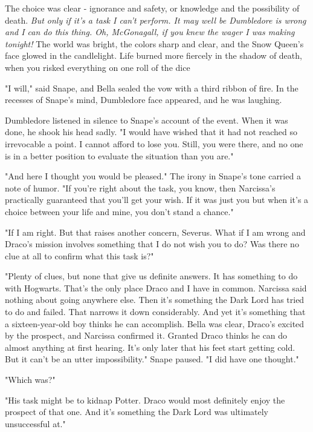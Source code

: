 The choice was clear - ignorance and safety, or knowledge and the possibility of death. \emph{But only if it's a task I can't perform. It may well be Dumbledore is wrong and I can do this thing. Oh, McGonagall, if you knew the wager I was making tonight!} The world was bright, the colors sharp and clear, and the Snow Queen's face glowed in the candlelight. Life burned more fiercely in the shadow of death, when you risked everything on one roll of the dice{\el}

"I will," said Snape, and Bella sealed the vow with a third ribbon of fire. In the recesses of Snape's mind, Dumbledore face appeared, and he was laughing.

\sbreak

Dumbledore listened in silence to Snape's account of the event. When it was done, he shook his head sadly. "I would have wished that it had not reached so irrevocable a point. I cannot afford to lose you. Still, you were there, and no one is in a better position to evaluate the situation than you are."

"And here I thought you would be pleased." The irony in Snape's tone carried a note of humor. "If you're right about the task, you know, then Narcissa's practically guaranteed that you'll get your wish. If it was just you{\el} but when it's a choice between your life and mine, you don't stand a chance."

"If I am right. But that raises another concern, Severus. What if I am wrong and Draco's mission involves something that I do not wish you to do? Was there no clue at all to confirm what this task is?"

"Plenty of clues, but none that give us definite answers. It has something to do with Hogwarts. That's the only place Draco and I have in common. Narcissa said nothing about going anywhere else. Then it's something the Dark Lord has tried to do and failed. That narrows it down considerably. And yet it's something that a sixteen-year-old boy thinks he can accomplish. Bella was clear, Draco's excited by the prospect, and Narcissa confirmed it. Granted Draco thinks he can do almost anything at first hearing. It's only later that his feet start getting cold. But it can't be an utter impossibility." Snape paused. "I did have one thought."

"Which was?"

"His task might be to kidnap Potter. Draco would most definitely enjoy the prospect of that one. And it's something the Dark Lord was ultimately unsuccessful at."

